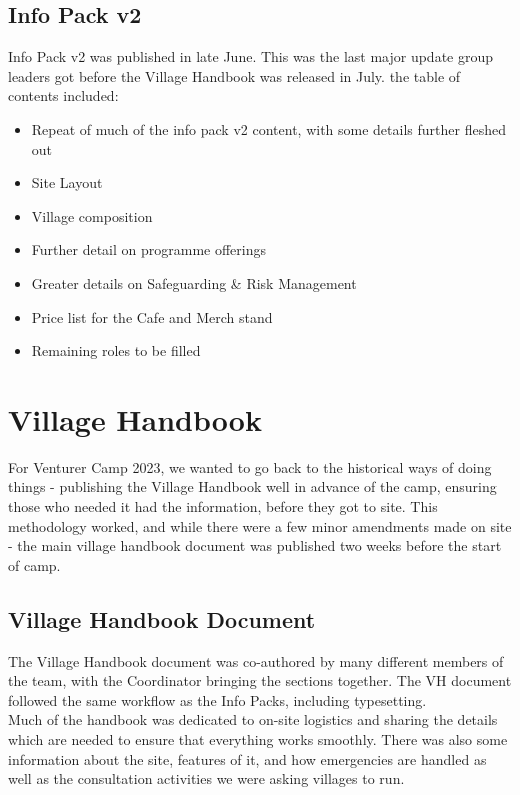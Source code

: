 \subsection{Info Pack v2}
Info Pack v2 was published in late June. This was the last major update group leaders got before the Village Handbook was released in July. the table of contents included:
\begin{itemize}
    \item Repeat of much of the info pack v2 content, with some details further fleshed out
    \item Site Layout
    \item Village composition
    \item Further detail on programme offerings
    \item Greater details on Safeguarding \& Risk Management
    \item Price list for the Cafe and Merch stand
    \item  Remaining roles to be filled
\end{itemize}

\section{Village Handbook}
For Venturer Camp 2023, we wanted to go back to the historical ways of doing things - publishing the Village Handbook well in advance of the camp, ensuring those who needed it had the information, before they got to site. This methodology worked, and while there were a few minor amendments made on site - the main village handbook document was published two weeks before the start of camp.
\subsection{Village Handbook Document}
The Village Handbook document was co-authored by many different members of the team, with the Coordinator bringing the sections together. The VH document followed the same workflow as the Info Packs, including typesetting.\\

Much of the handbook was dedicated to on-site logistics and sharing the details which are needed to ensure that everything works smoothly. There was also some information about the site, features of it, and how emergencies are handled as well as the consultation activities we were asking villages to run.\\

